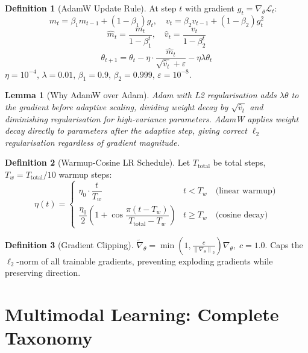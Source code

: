 \documentclass[12pt,a4paper]{article}
\theoremstyle{definition}
\newtheorem{definition}{Definition}[section]
\theoremstyle{plain}
\newtheorem{lemma}[theorem]{Lemma}
\theoremstyle{remark}
\newcommand{\Norm}[1]{\left\|#1\right\|}
\begin{document}
\begin{definition}[AdamW Update Rule]
At step $t$ with gradient $g_t = \nabla_\theta \mathcal{L}_t$:
\[
  m_t = \beta_1 m_{t-1} + (1-\beta_1)g_t, \quad v_t = \beta_2 v_{t-1} + (1-\beta_2)g_t^2
\]
\[
  \hat{m}_t = \frac{m_t}{1-\beta_1^t}, \quad \hat{v}_t = \frac{v_t}{1-\beta_2^t}
\]
\[
  \boxed{\theta_{t+1} = \theta_t - \eta \cdot \frac{\hat{m}_t}{\sqrt{\hat{v}_t}+\varepsilon} - \eta\lambda\theta_t}
\]
$\eta = 10^{-4}$, $\lambda = 0.01$, $\beta_1 = 0.9$, $\beta_2 = 0.999$, $\varepsilon = 10^{-8}$.
\end{definition}

\begin{lemma}[Why AdamW over Adam]
Adam with L2 regularisation adds $\lambda\theta$ to the gradient before adaptive scaling, dividing weight decay by $\sqrt{\hat{v}_t}$ and diminishing regularisation for high-variance parameters. AdamW applies weight decay directly to parameters after the adaptive step, giving correct $\ell_2$ regularisation regardless of gradient magnitude.
\end{lemma}

\begin{definition}[Warmup-Cosine LR Schedule]
Let $T_{\text{total}}$ be total steps, $T_w = T_{\text{total}}/10$ warmup steps:
\[
  \eta(t) = \begin{cases}
    \eta_0 \cdot \dfrac{t}{T_w} & t < T_w \quad\text{(linear warmup)}\\[6pt]
    \dfrac{\eta_0}{2}\!\left(1+\cos\dfrac{\pi(t-T_w)}{T_{\text{total}}-T_w}\right) & t \ge T_w \quad\text{(cosine decay)}
  \end{cases}
\]
\end{definition}

\begin{definition}[Gradient Clipping]
$\tilde{\nabla}_\theta = \min\!\left(1, \frac{c}{\Norm{\nabla_\theta}_2}\right)\nabla_\theta,\; c = 1.0$. Caps the $\ell_2$-norm of all trainable gradients, preventing exploding gradients while preserving direction.
\end{definition}

\newpage
\section{Multimodal Learning: Complete Taxonomy}
\label{sec:taxonomy}
\end{document}
